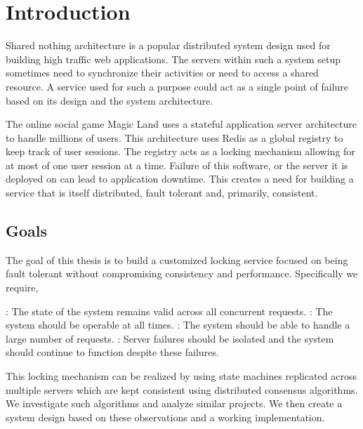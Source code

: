 \chapter{Introduction}
\label{chapter:introduction}

Shared nothing architecture%
 \citep{Stonebraker86g} is a popular distributed system design used for
building high traffic web applications. The servers within such a system setup
sometimes need to synchronize their activities or need to access a shared
resource. A service used for such a purpose could act as a single point of
failure based on its design and the system architecture.

The online social game Magic Land uses a stateful application server
architecture to handle millions of users. This architecture uses Redis as
a global registry to keep track of user sessions. The registry acts as a
locking mechanism allowing for at most of one user session at a time. Failure
of this software, or the server it is deployed on can
lead to application downtime. This creates a need for
building a service that is itself
distributed, fault tolerant and, primarily, consistent.

\section{Goals}

The goal of this thesis is to build a customized locking service focused on
being fault tolerant without compromising consistency and performance.
Specifically we require,

\begin{itemize}
    : The state of the system remains valid across
    all concurrent requests.
    : The system should be operable at all times.
    : The system should be able to handle a large number of
    requests.
    : Server failures should be isolated and the system
    should continue to function despite these failures.
\end{itemize}

This locking mechanism can be realized by using state machines replicated
across multiple servers which are kept consistent using distributed consensus
algorithms. We investigate such algorithms and analyze similar
projects. We then create a system design based on these observations and
a working implementation.

